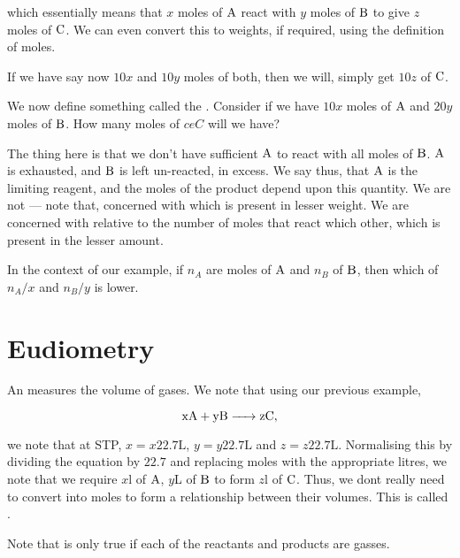 which essentially means that \(x\) moles of \(\ce{A}\) react with \(y\) moles of 
\(\ce{B}\) to give \(z\) moles of \(\ce{C}\). We can even convert this to weights, 
if required, using the definition of moles.

If we have say now \(10x\) and \(10y\) moles of both, then we will, simply get 
\(10z\) of \(\ce{C}\). 

We now define something called the . Consider if we have \(10x\) moles 
of \(\ce{A}\) and \(20y\) moles of \(\ce{B}\). How many moles of \(ce{C}\) will we have?

The thing here is that we don't have sufficient \(\ce{A}\) to react with all moles of 
\(\ce{B}\). \(\ce{A}\) is exhausted, and \(\ce{B}\) is left un-reacted, in excess. We say thus, that \(\ce{A}\) is the limiting reagent, and the 
moles of the product depend upon this quantity. We are not --- note that, concerned 
with which is present in lesser weight. We are concerned with relative to the number of moles 
that react which other, which is present in the lesser amount.

In the context of our example, if \(n_A\) are moles of \(\ce{A}\) and \(n_B\) of \(\ce{B}\),
then which of \(n_A/x\) and \(n_B/y\) is lower.

\section{Eudiometry}

An  measures the volume of gases. We note that using our previous 
example, 

\begin{equation*}
  \ce{xA + yB -> zC},
\end{equation*}

we note that at STP, \(x = x22.7\text{L}\), \(y = y22.7\text{L}\) and \(z = z22.7\text{L}\).
Normalising this by dividing the equation by \(22.7\) and replacing moles with the appropriate litres,
we note that we require \(x\)\si{\l} of \(\ce{A}\), \(y\)\si{L} of \(\ce{B}\) to form 
\(z\)\si{\l} of \(\ce{C}\). Thus, we dont really need to convert into moles to 
form a relationship between their volumes. This is called .  

Note that is only true if each of the reactants and products are gasses.